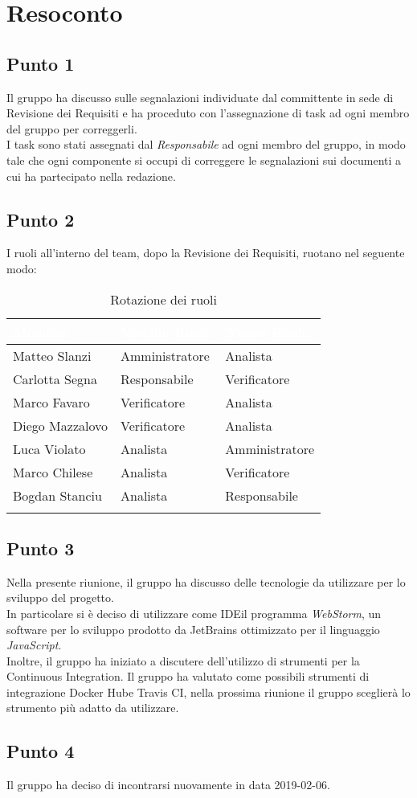 \section{Resoconto}

\subsection{Punto 1}
Il gruppo ha discusso sulle segnalazioni individuate dal committente in sede di Revisione dei Requisiti e ha proceduto con l'assegnazione di task ad ogni membro del gruppo per correggerli.
\\
I task sono stati assegnati dal \textit{Responsabile} ad ogni membro del gruppo, in modo tale che ogni componente si occupi di correggere le segnalazioni sui documenti a cui ha partecipato nella redazione.

\subsection{Punto 2}
I ruoli all'interno del team, dopo la Revisione dei Requisiti, ruotano nel seguente modo:\\
\begin{center}
\begin{longtable}[c]{|m{}|m{}|m{}|} 
\hline
\rowcolor{bluelogo}\textbf{\textcolor{white}{Membro}} & \textbf{\textcolor{white}{Vecchio Ruolo}} & \textbf{\textcolor{white}{Nuovo Ruolo}}\\
\hline
Matteo Slanzi & Amministratore & Analista\\
\hline
\rowcolor{grigio}Carlotta Segna & Responsabile & Verificatore\\
\hline
Marco Favaro & Verificatore & Analista\\
\hline
\rowcolor{grigio}Diego Mazzalovo & Verificatore & Analista\\
\hline
Luca Violato & Analista & Amministratore\\
\hline
\rowcolor{grigio}Marco Chilese & Analista & Verificatore\\
\hline
Bogdan Stanciu & Analista & Responsabile\\
\hline

\caption{Rotazione dei ruoli}
\end{longtable}
\end{center}

\subsection{Punto 3}
Nella presente riunione, il gruppo ha discusso delle tecnologie da utilizzare per lo sviluppo del progetto. 
\\
In particolare si è deciso di utilizzare come IDE\glossario il programma \textit{WebStorm}, un software per lo sviluppo prodotto da JetBrains ottimizzato per il linguaggio \textit{JavaScript}. 
\\
Inoltre, il gruppo ha iniziato a discutere dell'utilizzo di strumenti per la Continuous Integration\glossario. 
Il gruppo ha valutato come possibili strumenti di integrazione Docker Hub\glossario e Travis CI\glossario, nella prossima riunione il gruppo sceglierà lo strumento più adatto da utilizzare.

\subsection{Punto 4}
Il gruppo ha deciso di incontrarsi nuovamente in data 2019-02-06.